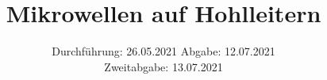 

\subject{V53}
\title{Mikrowellen auf Hohlleitern}
\date{%
  Durchführung: 26.05.2021
  \hspace{3em}
  Abgabe: 12.07.2021\\
  \hspace{6.28cm} \small{Zweitabgabe: 13.07.2021}
}



\maketitle
\thispagestyle{empty}
\tableofcontents
\newpage








\printbibliography{}


